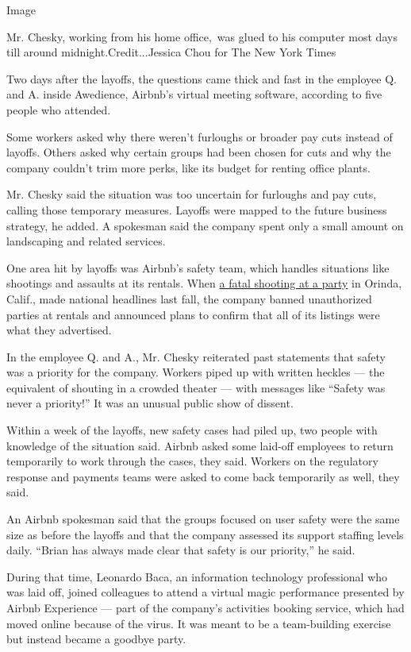 Image

Mr. Chesky, working from his home office,~was glued to his computer most
days till around midnight.Credit...Jessica Chou for The New York Times

Two days after the layoffs, the questions came thick and fast in the
employee Q. and A. inside Awedience, Airbnb's virtual meeting software,
according to five people who attended.

Some workers asked why there weren't furloughs or broader pay cuts
instead of layoffs. Others asked why certain groups had been chosen for
cuts and why the company couldn't trim more perks, like its budget for
renting office plants.

Mr. Chesky said the situation was too uncertain for furloughs and pay
cuts, calling those temporary measures. Layoffs were mapped to the
future business strategy, he added. A spokesman said the company spent
only a small amount on landscaping and related services.

One area hit by layoffs was Airbnb's safety team, which handles
situations like shootings and assaults at its rentals. When
\href{https://www.nytimes3xbfgragh.onion/2019/11/01/us/orinda-shooting.html}{a
fatal shooting at a party} in Orinda, Calif., made national headlines
last fall, the company banned unauthorized parties at rentals and
announced plans to confirm that all of its listings were what they
advertised.

In the employee Q. and A., Mr. Chesky reiterated past statements that
safety was a priority for the company. Workers piped up with written
heckles --- the equivalent of shouting in a crowded theater --- with
messages like ``Safety was never a priority!'' It was an unusual public
show of dissent.

Within a week of the layoffs, new safety cases had piled up, two people
with knowledge of the situation said. Airbnb asked some laid-off
employees to return temporarily to work through the cases, they said.
Workers on the regulatory response and payments teams were asked to come
back temporarily as well, they said.

An Airbnb spokesman said that the groups focused on user safety were the
same size as before the layoffs and that the company assessed its
support staffing levels daily. ``Brian has always made clear that safety
is our priority,'' he said.

During that time, Leonardo Baca, an information technology professional
who was laid off, joined colleagues to attend a virtual magic
performance presented by Airbnb Experience --- part of the company's
activities booking service, which had moved online because of the virus.
It was meant to be a team-building exercise but instead became a goodbye
party.

